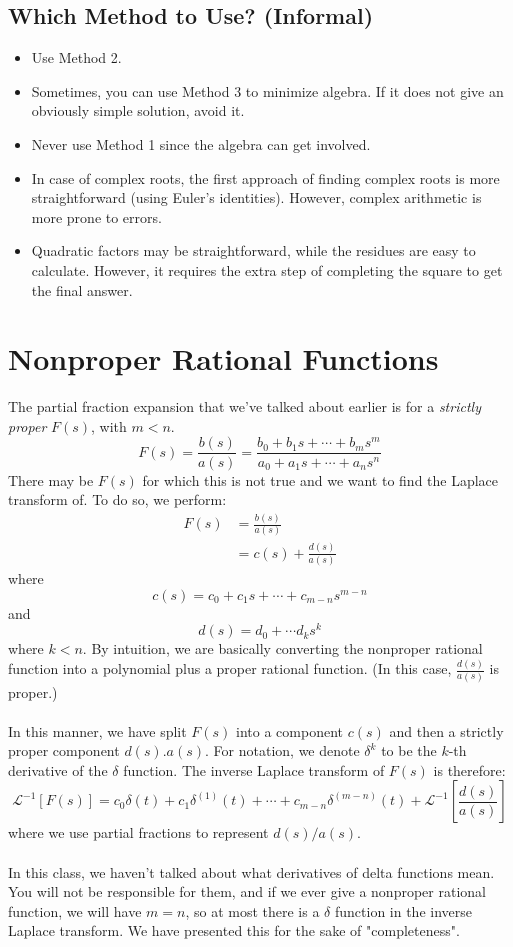 \documentclass[10pt]{article}
\newcommand{\laplace}{\mathcal{L}}
\begin{document}
\subsection*{Which Method to Use? (Informal)}
\begin{itemize}
    \item Use Method 2.
    \item Sometimes, you can use Method 3 to minimize algebra.  If it does not give an obviously simple solution, avoid it.
    \item Never use Method 1 since the algebra can get involved.
    \item In case of complex roots, the first approach of finding complex roots is more straightforward (using Euler's identities).  However, complex arithmetic is more prone to errors.
    \item Quadratic factors may be straightforward, while the residues are easy to calculate.  However, it requires the extra step of completing the square to get the final answer.
\end{itemize}
\pagebreak
\section*{Nonproper Rational Functions}
The partial fraction expansion that we've talked about earlier is for a \textit{strictly proper} $F(s)$, with $m < n$.
\[F(s) = \frac{b(s)}{a(s)} = \frac{b_0 + b_1 s + \cdots + b_m s^m}{a_0 + a_1 s + \cdots + a_n s^n}\]
There may be $F(s)$ for which this is not true and we want to find the Laplace transform of.  To do so, we perform:
\begin{align*}
    F(s) &= \frac{b(s)}{a(s)}\\
    &= c(s) + \frac{d(s)}{a(s)}
\end{align*}
where 
\[c(s) = c_0 + c_1 s + \cdots + c_{m-n}s^{m-n}\]
and 
\[d(s) = d_0 + \cdots d_k s^k\]
where $k < n$.  By intuition, we are basically converting the nonproper rational function into a polynomial plus a proper rational function.  (In this case, $\frac{d(s)}{a(s)}$ is proper.)\\\\
In this manner, we have split $F(s)$ into a component $c(s)$ and then a strictly proper component $d(s) . a(s)$.  For notation, we denote $\delta^k$ to be the $k$-th derivative of the $\delta$ function.  The inverse Laplace transform of $F(s)$ is therefore:
\[\laplace^{-1}[F(s)] = c_0 \delta(t) + c_1 \delta^{(1)}(t) + \cdots + c_{m - n}\delta^{(m - n)}(t) + \laplace^{-1}\left[\frac{d(s)}{a(s)}\right]\]
where we use partial fractions to represent $d(s) / a(s)$.\\\\
In this class, we haven't talked about what derivatives of delta functions mean.  You will not be responsible for them, and if we ever give a nonproper rational function, we will have $m = n$, so at most there is a $\delta$ function in the inverse Laplace transform.  We have presented this for the sake of "completeness".
\end{document}
